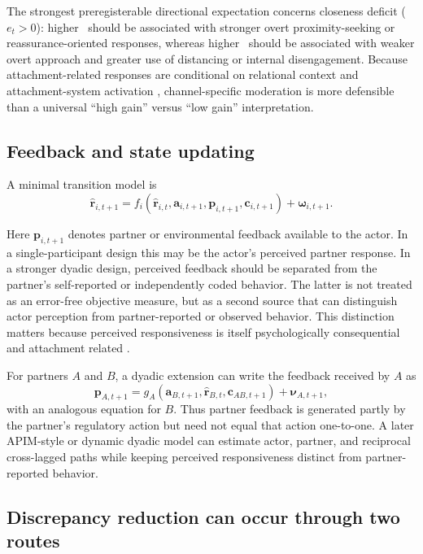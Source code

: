 The strongest preregisterable directional expectation concerns closeness deficit (\(e_t>0\)): higher \Anx\ should be associated with stronger overt proximity-seeking or reassurance-oriented responses, whereas higher \Avo\ should be associated with weaker overt approach and greater use of distancing or internal disengagement. Because attachment-related responses are conditional on relational context and attachment-system activation \parencite{campbell2011interactionist}, channel-specific moderation is more defensible than a universal ``high gain'' versus ``low gain'' interpretation.

\subsection{Feedback and state updating}

A minimal transition model is
\begin{equation}
\hat{\mathbf r}_{i,t+1}
=
f_i(
\hat{\mathbf r}_{i,t},
\mathbf a_{i,t+1},
\mathbf p_{i,t+1},
\mathbf c_{i,t+1}
)
+
\boldsymbol{\omega}_{i,t+1}.
\label{eq:state-update}
\end{equation}

Here \(\mathbf p_{i,t+1}\) denotes partner or environmental feedback available to the actor. In a single-participant design this may be the actor's perceived partner response. In a stronger dyadic design, perceived feedback should be separated from the partner's self-reported or independently coded behavior. The latter is not treated as an error-free objective measure, but as a second source that can distinguish actor perception from partner-reported or observed behavior. This distinction matters because perceived responsiveness is itself psychologically consequential and attachment related \parencite{ruan2020responsiveness,segal2016responsiveness}.

For partners \(A\) and \(B\), a dyadic extension can write the feedback received by \(A\) as
\[
\mathbf p_{A,t+1}
=
g_A\!\left(
\mathbf a_{B,t+1},
\hat{\mathbf r}_{B,t},
\mathbf c_{AB,t+1}
\right)
+
\boldsymbol{\nu}_{A,t+1},
\]
with an analogous equation for \(B\). Thus partner feedback is generated partly by the partner's regulatory action but need not equal that action one-to-one. A later APIM-style or dynamic dyadic model can estimate actor, partner, and reciprocal cross-lagged paths while keeping perceived responsiveness distinct from partner-reported behavior.

\subsection{Discrepancy reduction can occur through two routes}

